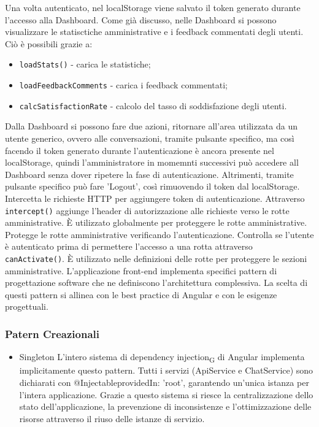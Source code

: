 Una volta autenticato, nel localStorage viene salvato il token generato durante l'accesso alla Dashboard.
Come già discusso, nelle Dashboard si possono visualizzare le statisctiche amministrative e i feedback commentati degli utenti. Ciò è possibili grazie a:
\begin{itemize}
    \item \texttt{loadStats()} - carica le statistiche;
    \item \texttt{loadFeedbackComments} - carica i feedback commentati;
    \item \texttt{calcSatisfactionRate} - calcolo del tasso di soddisfazione degli utenti. 
\end{itemize}
Dalla Dashboard si possono fare due azioni, ritornare all'area utilizzata da un utente generico, ovvero alle conversazioni, tramite pulsante specifico, ma così facendo il token generato durante l'autenticazione è ancora presente nel localStorage, quindi l'amministratore in momemnti successivi può accedere all Dashboard senza dover ripetere la fase di autenticazione. Altrimenti, tramite pulsante specifico può fare 'Logout', così rimuovendo il token dal localStorage.
Intercetta le richieste HTTP per aggiungere token di autenticazione. Attraverso \texttt{intercept()} aggiunge l'header di autorizzazione alle richieste verso le rotte amministrative. È utilizzato globalmente per proteggere le rotte amministrative.
Protegge le rotte amministrative verificando l'autenticazione. Controlla se l'utente è autenticato prima di permettere l'accesso a una rotta attraverso \texttt{canActivate()}. È utilizzato nelle definizioni delle rotte per proteggere le sezioni amministrative.
L'applicazione front-end implementa specifici pattern di progettazione software che ne definiscono l'architettura complessiva. La scelta di questi pattern si allinea con le best practice di Angular e con le esigenze progettuali.
\subsubsection*{Patern Creazionali}
\begin{itemize}
    \item Singleton
    \newline\newline L'intero sistema di dependency injection\textsubscript{G} di Angular implementa implicitamente questo pattern. Tutti i servizi (ApiService e ChatService) sono dichiarati con @Injectable{providedIn: 'root'}, garantendo un'unica istanza per l'intera applicazione. Grazie a questo sistema si riesce la centralizzazione dello stato dell'applicazione, la prevenzione di inconsistenze e l'ottimizzazione delle risorse attraverso il riuso delle istanze di servizio. 
\end{itemize}

